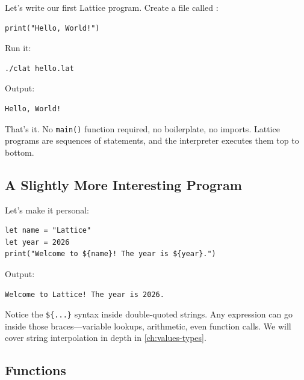 Let's write our first Lattice program.
Create a file called :

\begin{lstlisting}[language=Lattice, caption={hello.lat --- your first Lattice program}]
print("Hello, World!")
\end{lstlisting}

Run it:

\begin{lstlisting}[language=bash, numbers=none]
./clat hello.lat
\end{lstlisting}

Output:

\begin{lstlisting}[language=bash, numbers=none]
Hello, World!
\end{lstlisting}

That's it.
No \lstinline|main()| function required, no boilerplate, no imports.
Lattice programs are sequences of statements, and the interpreter executes them top to bottom.

\subsection{A Slightly More Interesting Program}\label{subsec:more-interesting}

Let's make it personal:

\begin{lstlisting}[language=Lattice, caption={greeting.lat --- string interpolation}]
let name = "Lattice"
let year = 2026
print("Welcome to ${name}! The year is ${year}.")
\end{lstlisting}

Output:

\begin{lstlisting}[language=bash, numbers=none]
Welcome to Lattice! The year is 2026.
\end{lstlisting}

Notice the \lstinline|${...}| syntax inside double-quoted strings.
Any expression can go inside those braces---variable lookups, arithmetic, even function calls.
We will cover string interpolation in depth in \cref{ch:values-types}.

\subsection{Functions}\label{subsec:first-functions}

